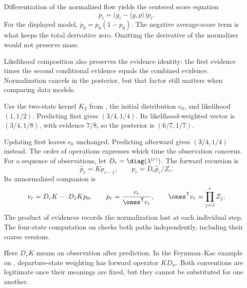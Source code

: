 Differentiation of the normalized flow yields the centered score equation
\[
\dot p_i=\bigl(g_i-\langle g,p\rangle\bigr)p_i.
\]
For the displayed model, $\dot p_0=p_0(1-p_0)$. The negative average-score term is what keeps the total derivative zero. Omitting the derivative of the normalizer would not preserve mass.

Likelihood composition also preserves the evidence identity: the first evidence times the second conditional evidence equals the combined evidence. Normalization cancels in the posterior, but that factor still matters when comparing data models.

Use the two-state kernel $K_2$ from , the initial distribution $e_0$, and likelihood $(1,1/2)$. Predicting first gives $(3/4,1/4)$. Its likelihood-weighted vector is $(3/4,1/8)$, with evidence $7/8$, so the posterior is $(6/7,1/7)$.

Updating first leaves $e_0$ unchanged. Predicting afterward gives $(3/4,1/4)$ instead. The order of operations expresses which time the observation concerns.
For a sequence of observations, let $D_r=\diag(\lambda^{(r)})$. The forward recursion is
\[
\widehat p_r=Kp_{r-1},\qquad p_r=D_r\widehat p_r/Z_r.
\]
Its unnormalized companion is
\[
v_r=D_rK\cdots D_1Kp_0,
\qquad p_r=\frac{v_r}{\ones^{\mathsf T}v_r},
\qquad \ones^{\mathsf T}v_r=\prod_{j=1}^r Z_j.
\]
The product of evidences records the normalization lost at each individual step. The four-state computation on  checks both paths independently, including their coarse versions.

Here $D_rK$ means an observation after prediction. In the Feynman--Kac example on , departure-state weighting has forward operator $K D_w$. Both conventions are legitimate once their meanings are fixed, but they cannot be substituted for one another.

